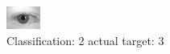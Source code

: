 \begin{figure}[h!]
\begin{center}
\includegraphics[width=0.60\columnwidth]{figures/ID516_class_2_target_3.png}
\end{center}
\caption{ Classification: 2 actual target: 3}
\label{fig:ID516_class_2_target_3}
\end{figure}
